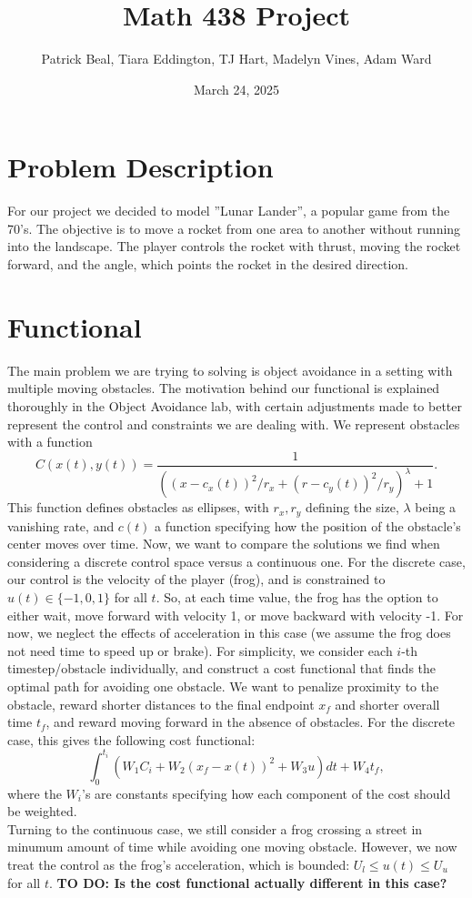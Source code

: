 \documentclass{article}
\title{Math 438 Project}
\author{Patrick Beal, Tiara Eddington, TJ Hart, Madelyn Vines, Adam Ward}
\date{March 24, 2025}
\begin{document}
\maketitle

\section{Problem Description}
For our project we decided to model ''Lunar Lander'', a popular game from the 70's. The objective is to move a rocket from one area to another without running into the landscape. The player controls the rocket with thrust, moving the rocket forward, and the angle, which points the rocket in the desired direction. 

\section{Functional}
The main problem we are trying to solving is object avoidance in a setting with multiple moving obstacles. The motivation behind our functional is explained thoroughly in the Object Avoidance lab, with certain adjustments made to better represent the control and constraints we are dealing with. We represent obstacles with a function $$C(x(t), y(t)) = \frac{1}{((x - c_x(t))^2 / r_x + (r - c_y(t))^2 / r_y)^\lambda + 1}.$$ This function defines obstacles as ellipses, with $r_x, r_y$ defining the size, $\lambda$ being a vanishing rate, and $c(t)$ a function specifying how the position of the obstacle's center moves over time.
Now, we want to compare the solutions we find when considering a discrete control space versus a continuous one. For the discrete case, our control is the velocity of the player (frog), and is constrained to $u(t) \in \{-1, 0, 1\}$ for all $t$. So, at each time value, the frog has the option to either wait, move forward with velocity 1, or move backward with velocity -1. For now, we neglect the effects of acceleration in this case (we assume the frog does not need time to speed up or brake). For simplicity, we consider each $i$-th timestep/obstacle individually, and construct a cost functional that finds the optimal path for avoiding one obstacle. We want to penalize proximity to the obstacle, reward shorter distances to the final endpoint $x_f$ and shorter overall time $t_f$, and reward moving forward in the absence of obstacles. For the discrete case, this gives the following cost functional: $$\int_{0}^{t_i} (W_1C_i + W_2(x_f - x(t))^2 + W_3u)dt + W_4t_f,$$ where the $W_i$'s are constants specifying how each component of the cost should be weighted.
\\ Turning to the continuous case, we still consider a frog crossing a street in minumum amount of time while avoiding one moving obstacle. However, we now treat the control as the frog's acceleration, which is bounded: $U_l \leq u(t) \leq U_u$ for all $t$. \textbf{TO DO: Is the cost functional actually different in this case?}
\end{document}
